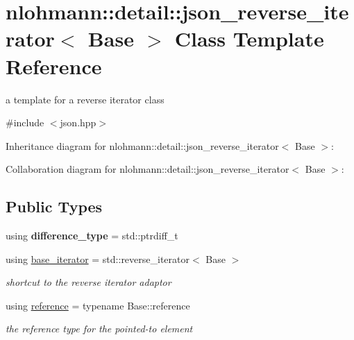 \hypertarget{classnlohmann_1_1detail_1_1json__reverse__iterator}{}\section{nlohmann\+:\+:detail\+:\+:json\+\_\+reverse\+\_\+iterator$<$ Base $>$ Class Template Reference}
\label{classnlohmann_1_1detail_1_1json__reverse__iterator}


a template for a reverse iterator class  




{\ttfamily \#include $<$json.\+hpp$>$}



Inheritance diagram for nlohmann\+:\+:detail\+:\+:json\+\_\+reverse\+\_\+iterator$<$ Base $>$\+:


Collaboration diagram for nlohmann\+:\+:detail\+:\+:json\+\_\+reverse\+\_\+iterator$<$ Base $>$\+:
\subsection*{Public Types}
\begin{DoxyCompactItemize}
\item 
using {\bfseries difference\+\_\+type} = std\+::ptrdiff\+\_\+t\hypertarget{classnlohmann_1_1detail_1_1json__reverse__iterator_a9ab55987c05ec6427ad36082e351cc45}{}\label{classnlohmann_1_1detail_1_1json__reverse__iterator_a9ab55987c05ec6427ad36082e351cc45}

\item 
using \hyperlink{classnlohmann_1_1detail_1_1json__reverse__iterator_a6b2ef1d632fe49bfcc22fbd1abd62395}{base\+\_\+iterator} = std\+::reverse\+\_\+iterator$<$ Base $>$\hypertarget{classnlohmann_1_1detail_1_1json__reverse__iterator_a6b2ef1d632fe49bfcc22fbd1abd62395}{}\label{classnlohmann_1_1detail_1_1json__reverse__iterator_a6b2ef1d632fe49bfcc22fbd1abd62395}

\begin{DoxyCompactList}\small\item\em shortcut to the reverse iterator adaptor \end{DoxyCompactList}\item 
using \hyperlink{classnlohmann_1_1detail_1_1json__reverse__iterator_a42f51a69bac7b2aebb613b2164e457f1}{reference} = typename Base\+::reference\hypertarget{classnlohmann_1_1detail_1_1json__reverse__iterator_a42f51a69bac7b2aebb613b2164e457f1}{}\label{classnlohmann_1_1detail_1_1json__reverse__iterator_a42f51a69bac7b2aebb613b2164e457f1}

\begin{DoxyCompactList}\small\item\em the reference type for the pointed-\/to element \end{DoxyCompactList}\end{DoxyCompactItemize}
